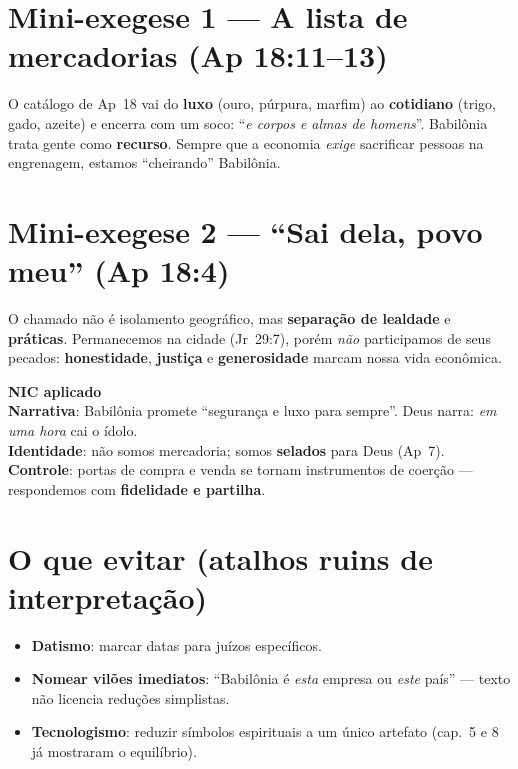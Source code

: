 \section{Mini-exegese 1 — A lista de mercadorias (Ap 18:11--13)}
O catálogo de Ap~18 vai do \textbf{luxo} (ouro, púrpura, marfim) ao \textbf{cotidiano} (trigo, gado, azeite) e encerra com um soco: ``\emph{e corpos e almas de homens}''. Babilônia trata gente como \textbf{recurso}. Sempre que a economia \emph{exige} sacrificar pessoas na engrenagem, estamos “cheirando” Babilônia.

\section{Mini-exegese 2 — ``Sai dela, povo meu'' (Ap 18:4)}
O chamado não é isolamento geográfico, mas \textbf{separação de lealdade} e \textbf{práticas}. Permanecemos na cidade (Jr~29:7), porém \emph{não} participamos de seus pecados: \textbf{honestidade}, \textbf{justiça} e \textbf{generosidade} marcam nossa vida econômica.

\begin{nicbox}
\textbf{NIC aplicado}\\
\textbf{Narrativa}: Babilônia promete “segurança e luxo para sempre”. Deus narra: \emph{em uma hora} cai o ídolo.\\
\textbf{Identidade}: não somos mercadoria; somos \textbf{selados} para Deus (Ap~7).\\
\textbf{Controle}: portas de compra e venda se tornam instrumentos de coerção — respondemos com \textbf{fidelidade e partilha}.
\end{nicbox}

\section{O que evitar (atalhos ruins de interpretação)}
\begin{checklist}[title={Sem sensacionalismo}]
\begin{itemize}[leftmargin=*,noitemsep]
  \item \textbf{Datismo}: marcar datas para juízos específicos.
  \item \textbf{Nomear vilões imediatos}: “Babilônia é \emph{esta} empresa ou \emph{este} país” — texto não licencia reduções simplistas.
  \item \textbf{Tecnologismo}: reduzir símbolos espirituais a um único artefato (cap.~5 e 8 já mostraram o equilíbrio).
\end{itemize}
\end{checklist}

